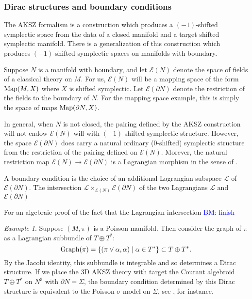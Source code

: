 \documentclass{article}
\newcommand{\TT}{{T\oplus T^*}}
\newcommand{\cE}{\mathcal{E}}
\theoremstyle{definition}
\theoremstyle{remark}
\newtheorem{Ex}[theorem]{Example}
\def\brian{\textcolor{blue}{BM: }\textcolor{blue}}
\begin{document}
\subsubsection{Dirac structures and boundary conditions}

The AKSZ formalism is a construction which produces a $(-1)$-shifted symplectic space from the data of a closed manifold and a target shifted symplectic manifold. 
There is a generalization of this construction which produces $(-1)$-shifted symplectic spaces on manifolds with boundary. 

Suppose $N$ is a manifold with boundary, and let $\cE(N)$ denote the space of fields of a classical theory on $M$. 
For us, $\cE(N)$ will be a mapping space of the form ${\rm Map}(M, X)$ where $X$ is shifted symplectic. 
Let $\cE(\partial N)$ denote the restriction of the fields to the boundary of $N$. 
For the mapping space example, this is simply the space of maps ${\rm Map}(\partial N, X)$.

In general, when $N$ is not closed, the pairing defined by the AKSZ construction will not endow $\cE(N)$ will with $(-1)$-shifted symplectic structure. 
However, the space $\cE(\partial N)$ does carry a natural ordinary ($0$-shifted) symplectic structure from the restriction of the pairing defined on $\cE(N)$. 
Morever, the natural restriction map $\cE(N) \to \cE(\partial N)$ is a Lagrangian morphism in the sense of \cite{PTVV}. 

\def\cL{\mathcal{L}}

A boundary condition is the choice of an additional Lagrangian subspace $\cL$ of $\cE(\partial N)$.
The intersection $\cL \times_{\cE(N)} \cE(\partial N)$ of the two Lagrangians $\cL$ and $\cE(\partial N)$ 

For an algebraic proof of the fact that the Lagrangian intersection \brian{finish} \cite{Calaque}

\begin{Ex}
Suppose $(M, \pi)$ is a Poisson manifold. 
Then consider the graph of $\pi$ as a Lagrangian subbundle of $\TT$:
\[
{\rm Graph}(\pi) = \{(\pi \vee \alpha , \alpha) \; | \; \alpha \in T^* \} \subset \TT .
\]
By the Jacobi identity, this subbundle is integrable and so determines a Dirac structure. 
If we place the 3D AKSZ theory with target the Courant algebroid $\TT$ on $N^3$ with $\partial N = \Sigma$, the boundary condition determined by this Dirac structure is equivalent to the Poisson $\sigma$-model on $\Sigma$, see \cite{KSSdirac}, for instance.
\end{Ex}
\end{document}
